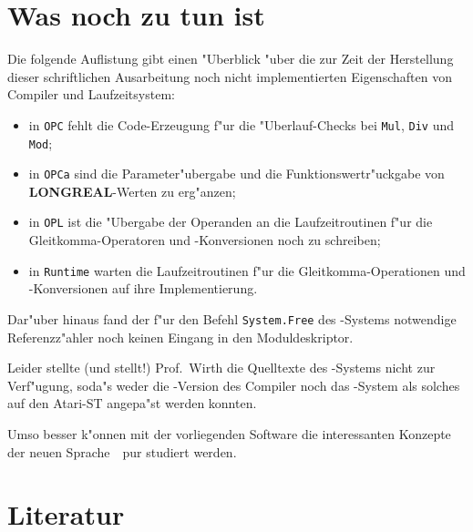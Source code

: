 \section{Was noch zu tun ist}

Die folgende Auflistung gibt einen "Uberblick "uber die zur Zeit der Herstellung
dieser schriftlichen Ausarbeitung noch nicht implementierten Eigenschaften
von Compiler und Laufzeitsystem:
\begin{itemize}
\item in {\tt OPC} fehlt die Code-Erzeugung f"ur die "Uberlauf-Checks bei
  {\tt Mul}, {\tt Div} und {\tt Mod};
\item in {\tt OPCa} sind die Parameter"ubergabe und die Funktionswertr"uckgabe
  von {\bf LONGREAL}-Werten zu erg"anzen;
\item in {\tt OPL} ist die "Ubergabe der Operanden an die Laufzeitroutinen
  f"ur die Gleitkomma-Operatoren und -Konversionen noch zu schreiben;
\item in {\tt Runtime} warten die Laufzeitroutinen f"ur die
  Gleitkomma-Operationen und -Konversionen auf ihre Implementierung.
\end{itemize}

Dar"uber hinaus fand der f"ur den Befehl {\tt System.Free} des \oberon-Systems
notwendige Referenzz"ahler noch keinen Eingang in den Moduldeskriptor.

\medskip
Leider stellte (und stellt!) Prof.~Wirth die Quelltexte des \oberon-Systems
nicht zur Verf"ugung, soda"s weder die \oberon-Version des Compiler noch
das \oberon-System als solches auf den Atari-ST angepa"st werden konnten.

Umso besser k"onnen mit der vorliegenden Software die interessanten
Konzepte der neuen Sprache~\oberon\ pur studiert werden.

\newpage
\section{Literatur}

